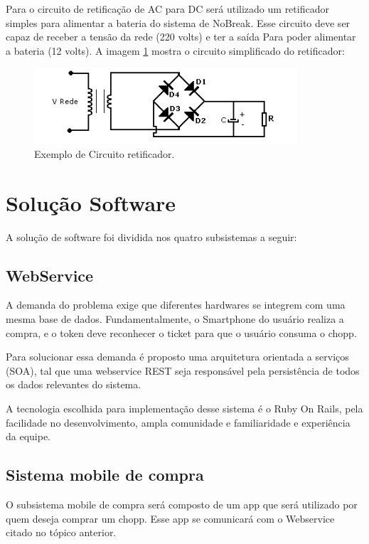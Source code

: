 			Para o circuito de retificação de AC para DC será utilizado um retificador simples para alimentar a 
			bateria do sistema de NoBreak. Esse circuito deve ser capaz de receber a tensão da rede (220 volts) e ter 
			a saída Para poder alimentar a bateria (12 volts). A imagem \ref{circuito-retificador} mostra o circuito simplificado do 
			retificador:

			\begin{figure}[H]
				\centering
				\includegraphics[scale= 0.7]{figuras/circuito-retificador.png}
				\caption{Exemplo de Circuito retificador.}
				\label{circuito-retificador}
			\end{figure}

	\section[Solução Software]{Solução Software}

		A solução de software foi dividida nos quatro subsistemas a seguir:

			\subsection[WebService]{WebService}
				A demanda do problema exige que diferentes hardwares se integrem com uma mesma base de dados. Fundamentalmente, o Smartphone do usuário realiza a compra, e o token deve reconhecer o ticket para que o usuário consuma o chopp.

				Para solucionar essa demanda é proposto uma arquitetura orientada a serviços (SOA), tal que uma webservice REST seja responsável pela persistência de todos os dados relevantes do sistema.
				
				A tecnologia escolhida para implementação desse sistema é o Ruby On Rails, pela facilidade no desenvolvimento, ampla comunidade e familiaridade e experiência da equipe.

			\subsection[Sistema mobile de compra]{Sistema mobile de compra}
				O subsistema mobile de compra será composto de um app que será utilizado por quem deseja comprar um chopp. Esse app se comunicará com o Webservice citado no tópico anterior.

